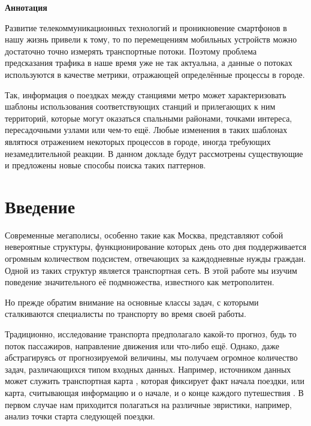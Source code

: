 \documentclass[12pt, fleqn, titlepage]{article}
\begin{document}
    \newpage
    \begin{center}
        \textbf{Аннотация}
    \end{center}

    Развитие телекоммуникационных технологий и проникновение смартфонов в нашу жизнь привели к тому, 
    то по перемещениям мобильных устройств можно достаточно точно измерять транспортные потоки. Поэтому 
    проблема предсказания трафика в наше время уже не так актуальна, а данные о потоках используются 
    в качестве метрики, отражающей определённые процессы в городе. 

    Так, информация о поездках между станциями метро может характеризовать шаблоны использования 
    соответствующих станций и прилегающих к ним территорий, которые могут оказаться спальными районами, 
    точками интереса, пересадочными узлами или чем-то ещё. Любые изменения в таких шаблонах являтюся отражением 
    некоторых процессов в городе, иногда требующих незамедлительной реакции. В данном докладе будут рассмотрены 
    существующие и предложены новые способы поиска таких паттернов. 
    \newpage

    \newpage
        \tableofcontents
    \newpage

    \section{Введение}

    Современные мегаполисы, особенно такие как Москва, представляют собой невероятные структуры, функционирование которых 
    день ото дня поддерживается огромным количеством подсистем, отвечающих за каждодневные нужды граждан. Одной из таких 
    структур является транспортная сеть. В этой работе мы изучим поведение значительного её подмножества, известного как 
    метрополитен.

    Но прежде обратим внимание на основные классы задач, с которыми сталкиваются специалисты по транспорту во время своей 
    работы.

    Традиционно, исследование транспорта предполагало какой-то прогноз, будь то поток пассажиров, направление движения или 
    что-либо ещё. Однако, даже абстрагируясь от прогнозируемой величины, мы получаем огромное количество задач, различающихся 
    типом входных данных. Например, источником данных может служить транспортная карта \cite{namiot2017survey}, 
    которая фиксирует факт начала поездки, или карта, считывающая информацию и о начале, и о конце каждого путешествия 
    \cite{duan2018understanding}. В первом случае нам приходится полагаться на различные эвристики, например, анализ 
    точки старта следующей поездки.
\end{document}
